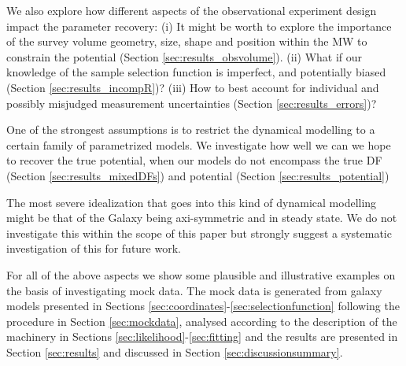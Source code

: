 We also explore how different aspects of the observational experiment design impact the parameter recovery: (i) It might be worth to explore the importance of the survey volume geometry, size, shape and position within the MW to constrain the potential (Section \ref{sec:results_obsvolume}). (ii) What if our knowledge of the sample selection function is imperfect, and potentially biased (Section \ref{sec:results_incompR})? (iii) How to best account for individual and possibly misjudged measurement uncertainties (Section \ref{sec:results_errors})?

One of the strongest assumptions is to restrict the dynamical modelling to a certain family of parametrized models. We investigate how well we can we hope to recover the true potential, when our models do not encompass the true DF (Section \ref{sec:results_mixedDFs}) and potential (Section \ref{sec:results_potential})

The most severe idealization that goes into this kind of dynamical modelling might be that of the Galaxy being axi-symmetric and in steady state. We do not investigate this within the scope of this paper but strongly suggest a systematic investigation of this for future work.

For all of the above aspects we show some plausible and illustrative examples on the basis of investigating mock data. The mock data is generated from galaxy models presented in Sections \ref{sec:coordinates}-\ref{sec:selectionfunction} following the procedure in Section \ref{sec:mockdata}, analysed according to the description of the \RM{} machinery in Sections \ref{sec:likelihood}-\ref{sec:fitting} and the results are presented in Section \ref{sec:results} and discussed in Section \ref{sec:discussionsummary}.

